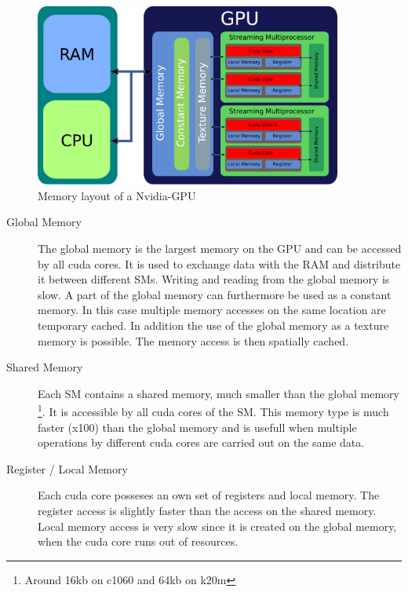 \begin{figure}[!tbp]
      \centering
        \includegraphics[width=0.9\textwidth]{gfx/cuda/gpu.pdf}
          \caption{Memory layout of a Nvidia-GPU}
    \label{fig:gpu_memory_layout}
\end{figure}

\begin{description}
    \item[Global Memory] The global memory is the largest memory on the GPU and can be accessed by all cuda cores.
                         It is  used to exchange data with the RAM and distribute it between different SMs.
                         Writing and reading from the global memory is slow. A part of the global memory can furthermore be used as a constant memory.
                         In this case multiple memory accesses on the same location are temporary cached.
                         In addition the use of the global memory as a texture memory is possible. The memory access is then spatially cached.


    \item[Shared Memory] Each SM contains a shared memory, much smaller than the global memory \footnote{Around 16kb on c1060 and 64kb on k20m}. It is accessible
                         by all cuda cores of the SM.
                         This memory type is much faster (x100) than the global memory and is usefull when multiple operations
                         by different cuda cores are carried out on the same data.

    \item[Register / Local Memory] Each cuda core posseses an own set of registers and local memory.
                                   The register access is slightly faster than the access  on the shared memory.
                                   Local memory access is very slow since
                                   it is created on the global memory, when the cuda core runs out of resources.
\end{description}

